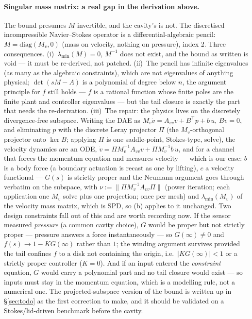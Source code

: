 \documentclass[11pt,a4paper]{article}
\begin{document}
{\paragraph{Singular mass matrix: a real gap in the derivation above.}
The bound presumes $M$ invertible, and the cavity's is not.  The discretised incompressible Navier--Stokes operator is a
differential-algebraic pencil: $M=\mathrm{diag}(M_v,0)$ (mass on velocity, nothing on
pressure), index 2.  Three consequences.  (i)~$\lambda_{\min}(M)=0$, $M^{-1}$ does not
exist, and the bound as written is void --- it must be re-derived, not patched.
(ii)~The pencil has infinite eigenvalues (as many as the algebraic constraints), which are
not eigenvalues of anything physical; $\det(sM-A)$ is a polynomial of degree below $n$,
the argument principle for $f$ still holds --- $f$ is a rational function whose finite
poles are the finite plant and controller eigenvalues --- but the tail closure is exactly
the part that needs the re-derivation.  (iii)~The repair: the physics lives on the
discretely divergence-free subspace.  Writing the DAE as
$M_v\dot v=A_{vv}v+B^{\!\top}p+b\,u$, $Bv=0$, and eliminating $p$ with the discrete Leray
projector $\Pi$ (the $M_v$-orthogonal projector onto $\ker B$; applying $\Pi$ is one
saddle-point, Stokes-type, solve), the velocity dynamics are an ODE,
$\dot v=\Pi M_v^{-1}A_{vv}v+\Pi M_v^{-1}b\,u$, and for a channel that forces the momentum
equation and measures velocity --- which is our case: $b$ is a body force (a boundary
actuation is recast as one by lifting), $c$ a velocity functional --- $G(s)$ is strictly
proper and the Neumann argument goes through verbatim on the subspace, with
$\nu:=\|\Pi M_v^{-1}A_{vv}\Pi\|$ (power iteration; each application one $M_v$ solve plus
one projection; once per mesh) and $\lambda_{\min}(M_v)$ of the velocity mass matrix,
which is SPD, so (b) applies to it unchanged.  Two design constraints fall out of this
and are worth recording now.  If the sensor measured \emph{pressure} (a common cavity
choice), $G$ would be proper but not strictly proper --- pressure answers a force
instantaneously --- so $G(\infty)\ne0$ and $f(s)\to1-KG(\infty)$ rather than $1$; the
winding argument survives provided the tail confines $f$ to a disk not containing the
origin, i.e.\ $|KG(\infty)|<1$ or a strictly proper controller ($K=0$).  And if an input
entered the \emph{constraint} equation, $G$ would carry a polynomial part and no tail
closure would exist --- so inputs must stay in the momentum equation, which is a
modelling rule, not a numerical one.  The projected-subspace version of the bound is
written up in \S\ref{sec:todo} as the first correction to make, and it should be
validated on a Stokes/lid-driven benchmark before the cavity.

}
\end{document}
